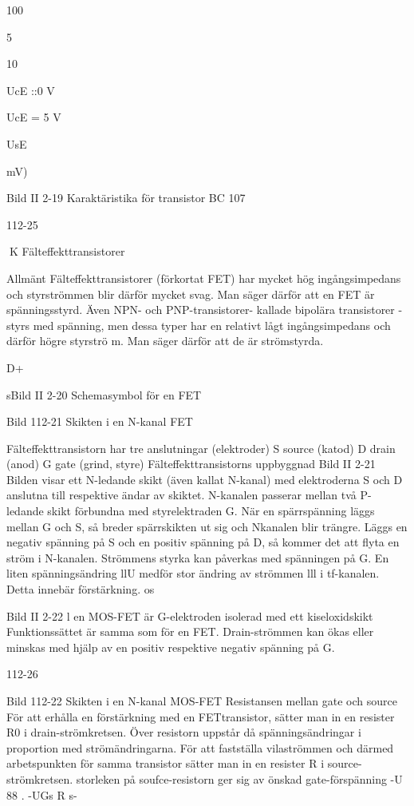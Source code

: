 \documentclass[a4paper,twoside,twocolumn,openright]{book}
\begin{document}
{{{100

5

10

UcE ::0 V

UcE = 5 V

UsE {mV)

Bild II 2-19 Karaktäristika för transistor BC 107

112-25

K
Fälteffekttransistorer

Allmänt
Fälteffekttransistorer (förkortat FET) har
mycket hög ingångsimpedans och styrströmmen blir därför mycket svag. Man säger
därför att en FET är spänningsstyrd.
Även NPN- och PNP-transistorer- kallade bipolära transistorer - styrs med spänning, men dessa typer har en relativt lågt
ingångsimpedans och därför högre styrströ m.
Man säger därför att de är strömstyrda.

D+

sBild II 2-20 Schemasymbol för en FET

Bild 112-21 Skikten i en N-kanal FET

Fälteffekttransistorn har tre anslutningar
(elektroder)
S source (katod)
D drain (anod)
G gate (grind, styre)
Fälteffekttransistorns uppbyggnad
Bild II 2-21
Bilden visar ett N-ledande skikt (även kallat
N-kanal) med elektroderna S och D anslutna
till respektive ändar av skiktet. N-kanalen
passerar mellan två P-ledande skikt förbundna med styrelektraden G.
När en spärrspänning läggs mellan G
och S, så breder spärrskikten ut sig och Nkanalen blir trängre. Läggs en negativ spänning på S och en positiv spänning på D, så
kommer det att flyta en ström i N-kanalen.
Strömmens styrka kan påverkas med spänningen på G.
En liten spänningsändring llU medför
stor ändring av strömmen lll i tf-kanalen.
Detta innebär förstärkning. os

Bild II 2-22
l en MOS-FET är G-elektroden isolerad med
ett kiseloxidskikt Funktionssättet är samma
som för en FET. Drain-strömmen kan ökas
eller minskas med hjälp av en positiv respektive negativ spänning på G.

112-26

Bild 112-22 Skikten i en N-kanal MOS-FET
Resistansen mellan gate och source
För att erhålla en förstärkning med en FETtransistor, sätter man in en resister R0 i
drain-strömkretsen. Över resistorn uppstår
då spänningsändringar i proportion med
strömändringarna.
För att fastställa vilaströmmen och därmed arbetspunkten för samma transistor
sätter man in en resister R i source-strömkretsen. storleken på soufce-resistorn ger
sig av önskad gate-förspänning -U 88 .
 -UGs
R s-

}}}}
\end{document}
